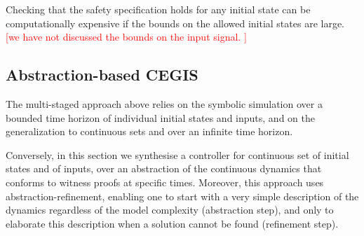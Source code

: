 \documentclass[twocolumn]{autart}    %
\renewcommand{\note}[1]{\textcolor{red}{[#1]}}
\begin{document}
Checking that the safety specification holds for any initial state can be
computationally expensive if the bounds on the allowed initial states are
large. \note{we have not discussed the bounds on the input signal. }

\subsection{Abstraction-based CEGIS} 
\label{sssec:abstraction}



The multi-staged approach above relies on the symbolic simulation over a bounded time horizon of individual initial states and inputs, 
and on the generalization to continuous sets and over an infinite time horizon. 





Conversely, in this section we synthesise a controller for continuous set of initial states and of inputs, 
over an abstraction of the continuous dynamics \cite{cattaruzza2015unbounded} that conforms to witness proofs at specific times.   
Moreover, this approach uses abstraction-refinement, 
enabling one to start with a very simple description of the dynamics regardless of the model complexity (abstraction step), 
and only to elaborate this description 
when a solution cannot be found (refinement step). 
\end{document}
